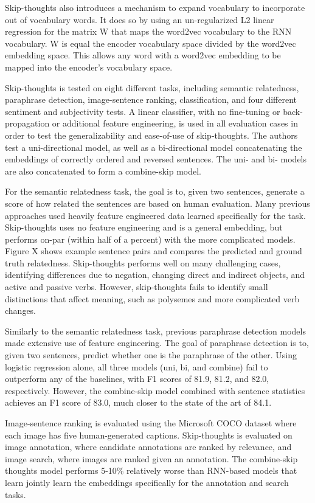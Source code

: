 Skip-thoughts also introduces a mechanism to expand vocabulary to incorporate out of vocabulary words. It does so by using an un-regularized L2 linear regression for the matrix W that maps the word2vec vocabulary to the RNN vocabulary. W is equal the encoder vocabulary space divided by the word2vec embedding space. This allows any word with a word2vec embedding to be mapped into the encoder's vocabulary space.

Skip-thoughts is tested on eight different tasks, including semantic relatedness, paraphrase detection, image-sentence ranking, classification, and four different sentiment and subjectivity tests. A linear classifier, with no fine-tuning or back-propagation or additional feature engineering, is used in all evaluation cases in order to test the generalizability and ease-of-use of skip-thoughts. The authors test a uni-directional model, as well as a bi-directional model concatenating the embeddings of correctly ordered and reversed sentences. The uni- and bi- models are also concatenated to form a combine-skip model.

For the semantic relatedness task, the goal is to, given two sentences, generate a score of how related the sentences are based on human evaluation. Many previous approaches used heavily feature engineered data learned specifically for the task. Skip-thoughts uses no feature engineering and is a general embedding, but performs on-par (within half of a percent) with the more complicated models. Figure X shows example sentence pairs and compares the predicted and ground truth relatedness. Skip-thoughts performs well on many challenging cases, identifying differences due to negation, changing direct and indirect objects, and active and passive verbs. However, skip-thoughts fails to identify small distinctions that affect meaning, such as polysemes and more complicated verb changes.

Similarly to the semantic relatedness task, previous paraphrase detection models made extensive use of feature engineering. The goal of paraphrase detection is to, given two sentences, predict whether one is the paraphrase of the other. Using logistic regression alone, all three models (uni, bi, and combine) fail to outperform any of the baselines, with F1 scores of 81.9, 81.2, and 82.0, respectively. However,  the combine-skip model combined with sentence statistics achieves an F1 score of 83.0, much closer to the state of the art of 84.1.

Image-sentence ranking is evaluated using the Microsoft COCO dataset where each image has five human-generated captions. Skip-thoughts is evaluated on image annotation, where candidate annotations are ranked by relevance, and image search, where images are ranked given an annotation. The combine-skip thoughts model performs 5-10\% relatively worse than RNN-based models that learn jointly learn the embeddings specifically for the annotation and search tasks. 

